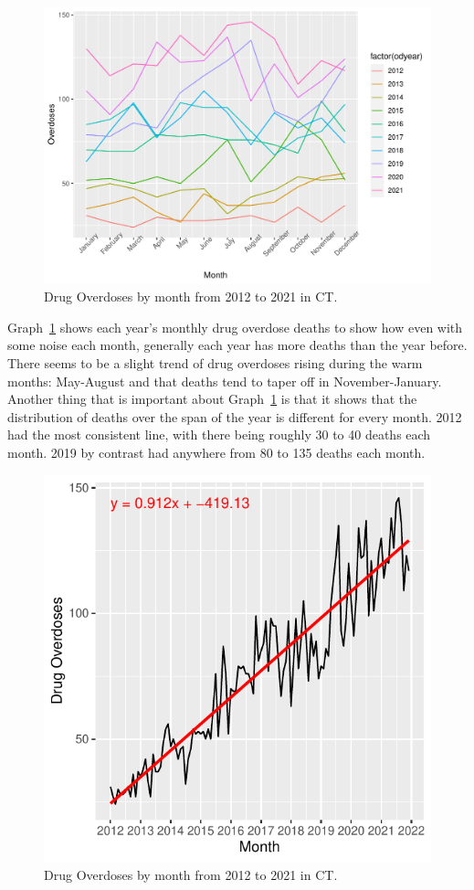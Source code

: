 \documentclass[12pt, letterpaper, titlepage]{article}
\begin{document}
\begin{figure}[tbp]
    \centering
    \includegraphics{Colorline}
    \caption{Drug Overdoses by month from 2012 to 2021 in CT.}
    \label{fig:Colorline}
  \end{figure}

Graph~\ref{fig:Colorline} shows each year's monthly drug overdose deaths to show how even with some noise each month, generally each year has more deaths than the year before.  There seems to be a slight trend of drug overdoses rising during the warm months: May-August and that deaths tend to taper off in November-January.
Another thing that is important about Graph~\ref{fig:Colorline} is that it shows that the distribution of deaths over the span of the year is different for every month.  2012 had the most consistent line, with there being roughly 30 to 40 deaths each month.  2019 by contrast had anywhere from 80 to 135 deaths each month. 

\begin{figure}[tbp]
    \centering
    \includegraphics{Trendline}
    \caption{Drug Overdoses by month from 2012 to 2021 in CT.}
    \label{fig:Trendline}
  \end{figure}
\end{document}
